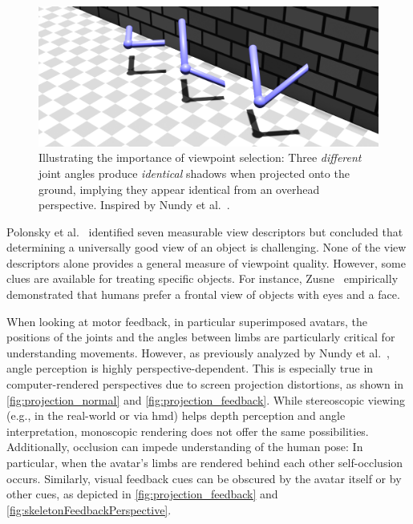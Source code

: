 \begin{figure}[t!h]
	\centering
	\includegraphics[width=\linewidth]{pictures/projection_normal.png}
	\caption[Illustrating the importance of viewpoint selection.]{Illustrating the importance of viewpoint selection: Three \emph{different} joint angles produce \emph{identical} shadows when projected onto the ground, implying they appear identical from an overhead perspective. Inspired by Nundy et al.~\cite{nundy2000wam}.}
	\label{fig:projection_normal}
\end{figure}

Polonsky et al.~\cite{polonsky2005wii} identified seven measurable view descriptors but concluded that determining a universally good view of an object is challenging. None of the view descriptors alone provides a general measure of viewpoint quality. However, some clues are available for treating specific objects. For instance, Zusne~\cite{zusne1970vpf} empirically demonstrated that humans prefer a frontal view of objects with eyes and a face.

When looking at motor feedback, in particular superimposed avatars, the positions of the joints and the angles between limbs are particularly critical for understanding movements. However, as previously analyzed by Nundy et al.~\cite{nundy2000wam}, angle perception is highly perspective-dependent. This is especially true in computer-rendered perspectives due to screen projection distortions, as shown in \autoref{fig:projection_normal} and \autoref{fig:projection_feedback}. While stereoscopic viewing (e.g., in the real-world or via \acrshort{hmd}) helps depth perception and angle interpretation, monoscopic rendering does not offer the same possibilities. Additionally, occlusion can impede understanding of the human pose: In particular, when the avatar's limbs are rendered behind each other self-occlusion occurs. Similarly, visual feedback cues can be obscured by the avatar itself or by other cues, as depicted in \autoref{fig:projection_feedback} and \autoref{fig:skeletonFeedbackPerspective}.


